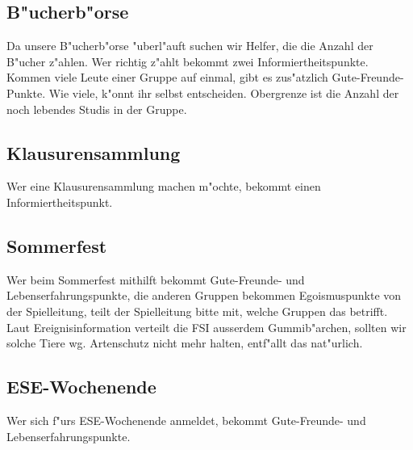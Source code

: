 \documentclass[12pt,a4paper]{article}
\begin{document}
\subsection*{B"ucherb"orse}

Da unsere B"ucherb"orse "uberl"auft suchen wir Helfer, die die 
Anzahl der B"ucher z"ahlen. Wer richtig z"ahlt bekommt zwei 
Informiertheitspunkte. Kommen viele Leute einer Gruppe auf einmal, 
gibt es zus"atzlich Gute-Freunde-Punkte. Wie viele, k"onnt ihr selbst 
entscheiden. Obergrenze ist die Anzahl der noch lebendes 
Studis in der Gruppe.

\subsection*{Klausurensammlung}

Wer eine Klausurensammlung machen m"ochte, bekommt einen 
Informiertheitspunkt.

\subsection*{Sommerfest}

Wer beim Sommerfest mithilft bekommt Gute-Freunde- und Lebenserfahrungspunkte,
die anderen Gruppen bekommen Egoismuspunkte von der Spielleitung,
teilt der Spielleitung bitte mit, welche Gruppen das betrifft. 
Laut Ereignisinformation
verteilt die FSI ausserdem Gummib"archen, sollten wir solche
Tiere wg. Artenschutz nicht mehr halten, entf"allt das nat"urlich.

\subsection*{ESE-Wochenende}

Wer sich f"urs ESE-Wochenende anmeldet, bekommt Gute-Freunde- und 
Lebenserfahrungspunkte.
\end{document}
